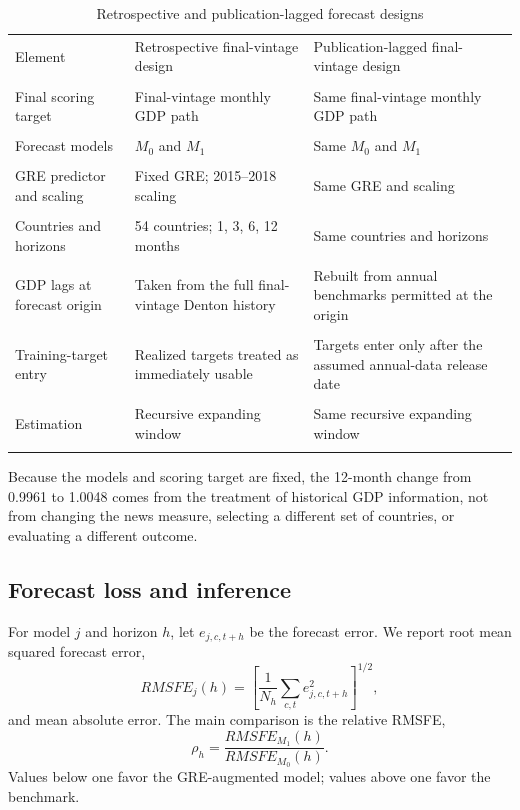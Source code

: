 \documentclass[preprint,12pt,authoryear]{elsarticle}
\begin{document}
\begin{table}[htbp]
\centering\small\singlespacing
\caption{Retrospective and publication-lagged forecast designs}
\label{tab:designcontrast}
\renewcommand{\arraystretch}{1.03}
\begin{tabularx}{\textwidth}{p{}XX}
\toprule
Element & Retrospective final-vintage design & Publication-lagged final-vintage design \\\\
\midrule
Final scoring target & Final-vintage monthly GDP path & Same final-vintage monthly GDP path \\\\
Forecast models & $M_0$ and $M_1$ & Same $M_0$ and $M_1$ \\\\
GRE predictor and scaling & Fixed GRE; 2015--2018 scaling & Same GRE and scaling \\\\
Countries and horizons & 54 countries; 1, 3, 6, 12 months & Same countries and horizons \\\\
GDP lags at forecast origin & Taken from the full final-vintage Denton history & Rebuilt from annual benchmarks permitted at the origin \\\\
Training-target entry & Realized targets treated as immediately usable & Targets enter only after the assumed annual-data release date \\\\
Estimation & Recursive expanding window & Same recursive expanding window \\\\
\bottomrule
\end{tabularx}
\end{table}

Because the models and scoring target are fixed, the 12-month change from 0.9961 to 1.0048 comes from the treatment of historical GDP information, not from changing the news measure, selecting a different set of countries, or evaluating a different outcome.

\subsection{Forecast loss and inference}

For model $j$ and horizon $h$, let $e_{j,c,t+h}$ be the forecast error. We report root mean squared forecast error,
\begin{equation}
RMSFE_j(h)=\left[\frac{1}{N_h}\sum_{c,t} e_{j,c,t+h}^2\right]^{1/2},
\end{equation}
and mean absolute error. The main comparison is the relative RMSFE,
\begin{equation}
\rho_h=\frac{RMSFE_{M_1}(h)}{RMSFE_{M_0}(h)}.
\label{eq:relative_rmsfe}
\end{equation}
Values below one favor the GRE-augmented model; values above one favor the benchmark.
\end{document}
